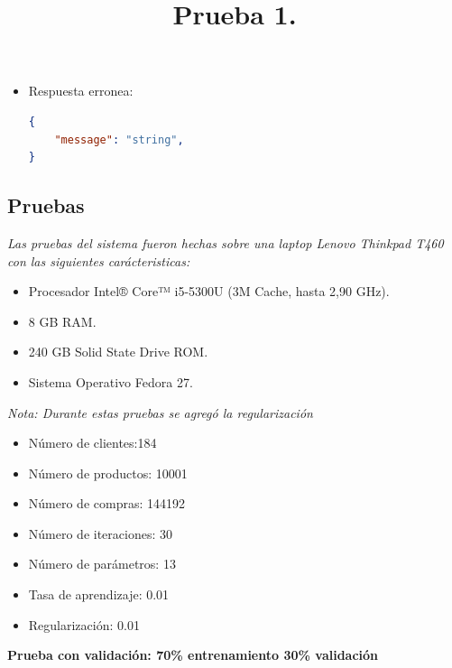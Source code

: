 {{{{{\begin{itemize}
\begin{itemize}
\item Respuesta erronea:
\begin{lstlisting}[language=json,firstnumber=1]
{
    "message": "string",
}
\end{lstlisting}
\end{itemize}
\end{itemize}

\subsection{Pruebas}
\textit{Las pruebas del sistema fueron hechas sobre una laptop Lenovo Thinkpad T460 con las siguientes carácteristicas:\\}
\begin{itemize}
\item Procesador Intel® Core™ i5-5300U (3M Cache, hasta 2,90 GHz).
\item 8 GB RAM.
\item 240 GB Solid State Drive ROM.
\item Sistema Operativo Fedora 27.
\end{itemize}
\textit{Nota: Durante estas pruebas se agregó la regularización}

\title{\textbf{Prueba 1.}}

\begin{itemize}
\item Número de clientes:184
\item Número de productos: 10001
\item Número de compras: 144192
\item Número de iteraciones: 30
\item Número de parámetros: 13
\item Tasa de aprendizaje: 0.01
\item Regularización: 0.01
\end{itemize}
\newpage
\textbf{Prueba con validación: 70\% entrenamiento 30\% validación}

}}}}}

